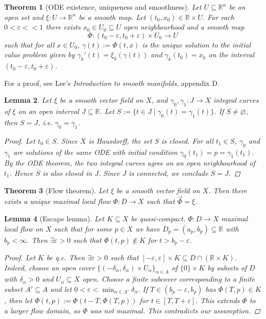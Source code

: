 \documentclass[12pt]{article}
\theoremstyle{darkgreentheorem}
\newtheorem{thm}{Theorem}[section]
\newtheorem{lm}[thm]{Lemma}
\theoremstyle{darkbluedefinition}
\theoremstyle{darkredexample}
\theoremstyle{remark}
\newcommand{\R}{\mathbb{R}}
\newcommand{\1}{\mathbbm{1}}
\newcommand{\tms}{\times}
\newcommand{\sub}{\subseteq}
\begin{document}
\begin{thm}[ODE existence, uniqueness and smoothness]
    Let $U\sub \R^{n}$ be an open set and $\xi\colon U\to \R^{n}$ be a smooth map.
    Let $(t_{0},x_{0})\in \R\tms U$.
    For each $0<\varepsilon <<1$ there exists $x_{0}\in U_{0}\sub U$ open neighbourhood and a smooth map
    \[ \Phi\colon (t_{0}-\varepsilon,t_{0}+\varepsilon)\tms U_{0}\to U \]
    such that for all $x\in U_{0}$, $\gamma(t):=\Phi(t,x)$ is the unique solution to the initial value problem given by $\gamma_{k}'(t)=\xi_{k}(\gamma(t))$ and $\gamma_{k}(t_{0})=x_{k}$ on the interval $(t_{0}-\varepsilon ,t_{0}+\varepsilon )$.
\end{thm}

For a proof, see Lee's \textit{Introduction to smooth manifolds}, appendix D.

\begin{lm}
    Let $\xi$ be a smooth vector field on $X$, and $\gamma_{0},\gamma_{1}\colon J\to X$ integral curves of $\xi$ on an open interval $J\sub \R$.
    Let $S:=\{t\in J\mid \gamma_{0}(t)=\gamma_{1}(t)\}$.
    If $S\neq \varnothing$, then $S=J$, i.e. $\gamma_{0}=\gamma_{1}$.
    \begin{proof}
	Let $t_{0}\in S$.
	Since $X$ is Hausdorff, the set $S$ is closed.
	For all $t_{1}\in S$, $\gamma_{0}$ and $\gamma_{1}$ are solutions of the same ODE with initial condition $\gamma_{0}(t_{1})=p=\gamma_{1}(t_{1})$.
	By the ODE theorem, the two integral curves agree on an open neighbourhood of $t_{1}$.
	Hence $S$ is also closed in $J$.
	Since $J$ is connected, we conclude $S=J$.
    \end{proof}
\end{lm}

\begin{thm}[Flow theorem]
    Let $\xi$ be a smooth vector field on $X$.
    Then there exists a unique maximal local flow $\Phi\colon D\to X$ such that $\vec{\Phi}=\xi$.
\end{thm}

\begin{lm}[Escape lemma]
    Let $K\sub X$ be quasi-compact.
    $\Phi\colon D\to X$ maximal local flow on $X$ such that for some $p\in X$ we have $D_{p}=(a_{p},b_{p})\sub \R$ with $b_{p}<\infty$.
    Then $\exists \varepsilon >0$ such that $\Phi(t,p)\not\in K$ for $t>b_{p}-\varepsilon$.
    \begin{proof}
	Let $K$ be q.c.
	Then $\exists \varepsilon >0$ such that $[-\varepsilon,\varepsilon ]\tms K\sub D\cap (\R\tms K)$.
	Indeed, choose an open cover $\{(-\delta_{\alpha},\delta_{\alpha})\tms U_{\alpha}\}_{\alpha\in A}$ of $\{0\}\tms K$ by subsets of $D$ with $\delta_{\alpha}>0$ and $U_{\alpha}\sub X$ open.
	Choose a finite subcover corresponding to a finite subset $A'\sub A$ and let $0<\varepsilon <\min_{\alpha\in A'}{\delta_{\alpha}}$.
	If $T\in (b_{p}-\varepsilon,b_{p})$ has $\Phi(T,p)\in K$, then let $\Phi(t,p):=\Phi(t-T,\Phi(T,p))$ for $t\in [T,T+\varepsilon ]$.
	This extends $\Phi$ to a larger flow domain, so $\Phi$ was not maximal.
	This contradicts our assumption.
    \end{proof}
\end{lm}
\end{document}
